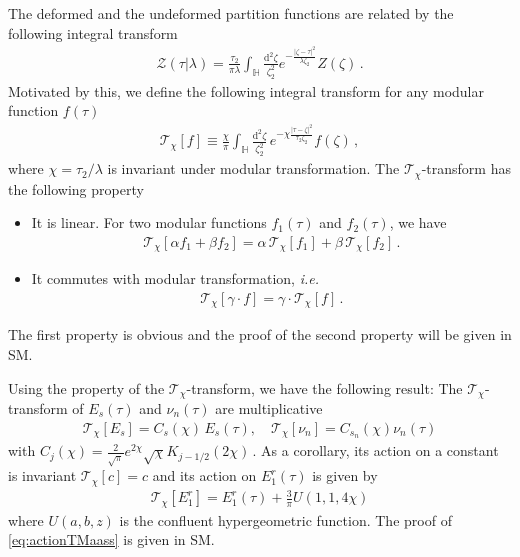 \documentclass[aps,twocolumn,prl,showpacs,amsmath,amssymb,10pt]{revtex4-2}
\begin{document}
\vspace{0.3cm}
The deformed and the undeformed partition functions are related by the following integral transform \cite{Dubovsky:2018bmo,Hashimoto:2019wct}
\begin{align}
\label{eq:intTransform}
\mathcal{Z}(\tau|\lambda)=\frac{\tau_2}{\pi\lambda}\int_{\mathbb{H}}\frac{\mathrm{d}^2\zeta}{\zeta_2^2}e^{-\frac{|\zeta-\tau|^2}{\lambda\zeta_2}}Z(\zeta)\,.
\end{align}
Motivated by this, we define the following integral transform for any modular function $f(\tau)$
\begin{align}
\label{eq:defTchi1}
\mathcal{T}_{\chi}[f]\equiv\frac{\chi}{\pi}\int_{\mathbb{H}}\frac{\mathrm{d}^2\zeta}{\zeta_2^2}\,e^{-\chi\frac{|\tau-\zeta|^2}{\tau_2\zeta_2}}f(\zeta)\,,
\end{align}
where $\chi=\tau_2/\lambda$ is invariant under modular transformation. The $\mathcal{T}_{\chi}$-transform has the following property
\begin{itemize}
\item It is linear. For two modular functions $f_1(\tau)$ and $f_2(\tau)$, we have
\begin{align}
\mathcal{T}_{\chi}[\alpha f_1+\beta f_2]=\alpha\,\mathcal{T}_{\chi}[f_1]+\beta\,\mathcal{T}_{\chi}[f_2]\,.
\end{align}
\item It commutes with modular transformation, \emph{i.e.}
\begin{align}
\label{eq:defTchi}
\mathcal{T}_{\chi}[\gamma\cdot f]=\gamma\cdot\mathcal{T}_{\chi}[f]\,.
\end{align}
\end{itemize}
The first property is obvious and the proof of the second property will be given in SM.

\vspace{0.3cm}
Using the property of the $\mathcal{T}_{\chi}$-transform, we have the following result: The $\mathcal{T}_{\chi}$-transform of $E_s(\tau)$ and $\nu_n(\tau)$ are multiplicative
\begin{align}
\label{eq:actionTMaass}
\mathcal{T}_{\chi}[E_s]=C_s(\chi)\,E_s(\tau),\quad \mathcal{T}_{\chi}[\nu_n]=C_{s_n}(\chi)\nu_n(\tau)
\end{align}
with $C_j(\chi)=\frac{2}{\sqrt{\pi}}e^{2\chi}\sqrt{\chi}K_{j-1/2}(2\chi)$\,. As a corollary, its action on a constant is invariant $\mathcal{T}_{\chi}[c]=c$ and its action on $E_1^r(\tau)$ is given by
\begin{align}
\label{eq:TchiE1}
\mathcal{T}_{\chi}[E_1^r]=E_1^r(\tau)+\frac{3}{\pi}U(1,1,4\chi)
\end{align}
where $U(a,b,z)$ is the confluent hypergeometric function. The proof of \eqref{eq:actionTMaass} is given in SM.
\end{document}
